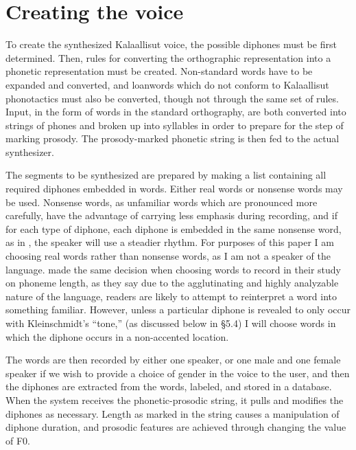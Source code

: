 \documentclass[12pt]{article}
\begin{document}
\section{Creating the voice}

To create the synthesized Kalaallisut voice, the possible diphones must be first determined. Then, rules for converting the orthographic representation into a phonetic representation must be created. Non-standard words have to be expanded and converted, and loanwords which do not conform to Kalaallisut phonotactics must also be converted, though not through the same set of rules. Input, in the form of words in the standard orthography, are both converted into strings of phones and broken up into syllables in order to prepare for the step of marking prosody. The prosody-marked phonetic string is then fed to the actual synthesizer. \par

The segments to be synthesized are prepared by making a list containing all required diphones embedded in words. Either real words or nonsense words may be used. Nonsense words, as unfamiliar words which are pronounced more carefully, have the advantage of carrying less emphasis during recording, and if for each type of diphone, each diphone is embedded in the same nonsense word, as in \citet{mongolian}, the speaker will use a steadier rhythm. For purposes of this paper I am choosing real words rather than nonsense words, as I am not a speaker of the language. \citet{quan} made the same decision when choosing words to record in their study on phoneme length, as they say due to the agglutinating and highly analyzable nature of the language, readers are likely to attempt to reinterpret a word into something familiar. However, unless a particular diphone is revealed to only occur with Kleinschmidt's ``tone,'' (as discussed below in \S 5.4) I will choose words in which the diphone occurs in a non-accented location.\par

The words are then recorded by either one speaker, or one male and one female speaker if we wish to provide a choice of gender in the voice to the user, and then the diphones are extracted from the words, labeled, and stored in a database. When the system receives the phonetic-prosodic string, it pulls and modifies the diphones as necessary. Length as marked in the string causes a manipulation of diphone duration, and prosodic features are achieved through changing the value of F0.\par
\end{document}
